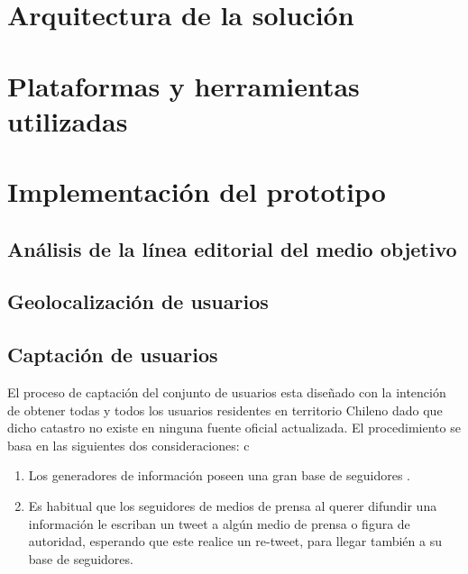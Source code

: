 \section{Arquitectura de la solución}
	
	
	
	
\section{Plataformas y herramientas utilizadas}



\section{Implementación del prototipo}




\subsection{Análisis de la línea editorial del medio objetivo}
	
\newpage

\subsection{Geolocalización de usuarios}\label{sec:geo}
\label{subsec:geo1}
	

\newpage
\subsection{Captación de usuarios}

El proceso de captación del conjunto de usuarios esta diseñado con la intención de obtener todas y todos los usuarios residentes en territorio Chileno dado que dicho catastro no existe en ninguna fuente oficial actualizada. El procedimiento se basa en las siguientes dos consideraciones: c
\begin{enumerate}
	\item Los generadores de información poseen una gran base de seguidores \cite{JavaEtAl:07}.
	\item Es habitual que los seguidores de medios de prensa al querer difundir una información le escriban un tweet a algún medio de prensa o figura de autoridad, esperando que este realice un re-tweet, para llegar también a su base de seguidores.
\end{enumerate}

